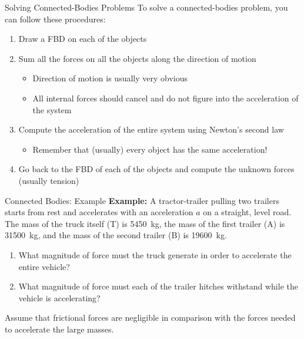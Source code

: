 \documentclass[12pt,compress,aspectratio=169]{beamer}
\begin{document}
\begin{frame}{Solving Connected-Bodies Problems}
  To solve a connected-bodies problem, you can follow these procedures:
  \begin{enumerate}
  \item Draw a FBD on each of the objects
  \item Sum all the forces on all the objects along the direction of motion
    \begin{itemize}
    \item Direction of motion is usually very obvious
    \item All internal forces should cancel and do not figure into the
      acceleration of the system
    \end{itemize}
  \item Compute the acceleration of the entire system using Newton's second law
    \begin{itemize}
    \item Remember that (usually) every object has the same acceleration!
    \end{itemize}
  \item Go back to the FBD of each of the objects and compute the unknown
    forces (usually tension)
  \end{enumerate}
\end{frame}



\begin{frame}{Connected Bodies: Example}
  \textbf{Example:} A tractor-trailer pulling two trailers starts from rest
  and accelerates with an acceleration $a$ on a straight, level road.
  The mass of the truck itself (T) is  %
  \SI{5450}{kg}, the
  mass of the first trailer (A) is \SI{31500}{kg}, and the mass of the second
  trailer (B) is \SI{19600}{kg}.
  \begin{enumerate}
  \item What magnitude of force must the truck generate in order to accelerate
    the entire vehicle?
  \item What magnitude of force must each of the trailer hitches withstand
    while the vehicle is accelerating?
  \end{enumerate}
  Assume that frictional forces are negligible in comparison with the forces
  needed to accelerate the large masses.
\end{frame}
\end{document}
